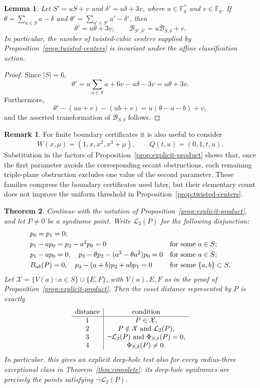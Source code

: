 ﻿\documentclass[11pt]{article}
\newcommand{\F}{\mathbb F}
\theoremstyle{plain}
\newtheorem{theorem}{Theorem}[section]
\newtheorem{lemma}[theorem]{Lemma}
\theoremstyle{definition}
\newtheorem{remark}{Remark}[section]
\begin{document}
\begin{lemma}
\label{lem:affine-covariance}
Let \(S'=uS+v\) and \(\delta'=u\delta+3v\), where
\(u\in\F_q^\ast\) and \(v\in\F_q\).  If
\(\theta=\sum_{a\in S}a-\delta\) and
\(\theta'=\sum_{a'\in S'}a'-\delta'\), then
\[
 \theta'=u\theta+3v,\qquad
 \mathcal{B}_{S',\delta'}=u\mathcal{B}_{S,\delta}+v.
\]
In particular, the number of twisted-cubic centers supplied by
Proposition~\ref{prop:twisted-centers} is invariant under the affine
classification action.
\end{lemma}

\begin{proof}
Since \(|S|=6\),
\[
 \theta'=u\sum_{a\in S}a+6v-u\delta-3v=u\theta+3v.
\]
Furthermore,
\[
 \theta'-(ua+v)-(ub+v)=u(\theta-a-b)+v,
\]
and the asserted transformation of \(\mathcal{B}_{S,\delta}\) follows.
\end{proof}

\begin{remark}\label{rem:boundary-families}
For finite boundary certificates it is also useful to consider
\[
 W(x,\mu)=(1,x,x^2,x^3+\mu),\qquad Q(t,u)=(0,1,t,u).
\]
Substitution in the factors of Proposition~\ref{prop:explicit-product}
shows that, once the first parameter avoids the corresponding secant
obstructions, each remaining triple-plane obstruction excludes one value
of the second parameter.  These families compress the boundary
certificates used later, but their elementary count does not improve the
uniform threshold in Proposition~\ref{prop:twisted-centers}.
\end{remark}

\begin{theorem}
\label{thm:distance-stratification}
Continue with the notation of Proposition~\ref{prop:explicit-product}, and
let \(P\ne0\) be a syndrome point.  Write \(\mathcal L_2(P)\) for the
following disjunction:
\[
\begin{array}{ll}
p_0=p_1=0; & \\[1mm]
p_1-ap_0=p_2-a^2p_0=0
  &\hbox{for some }a\in S;\\[1mm]
p_1-ap_0=0,\quad
p_3-\theta p_2-(a^3-\theta a^2)p_0=0
  &\hbox{for some }a\in S;\\[1mm]
B_{ab}(P)=0,\quad
p_3-(a+b)p_2+abp_1=0
  &\hbox{for some }\{a,b\}\subset S.
\end{array}
\]
Let \(\mathcal X=\{V(a):a\in S\}\cup\{E,F\}\), with \(V(a),E,F\) as in
the proof of Proposition~\ref{prop:explicit-product}.  Then the coset
distance represented by \(P\) is exactly
\[
\begin{array}{c|c}
\hbox{distance}&\hbox{condition}\\ \hline
1&P\in\mathcal X,\\
2&P\notin\mathcal X\ \hbox{and}\ \mathcal L_2(P),\\
3&\neg\mathcal L_2(P)\ \hbox{and}\ \Phi_{S,\delta}(P)=0,\\
4&\Phi_{S,\delta}(P)\ne0.
\end{array}
\]
In particular, this gives an explicit deep-hole test also for every
radius-three exceptional class in Theorem~\ref{thm:complete}: its deep-hole
syndromes are precisely the points satisfying \(\neg\mathcal L_2(P)\).
\end{theorem}
\end{document}
